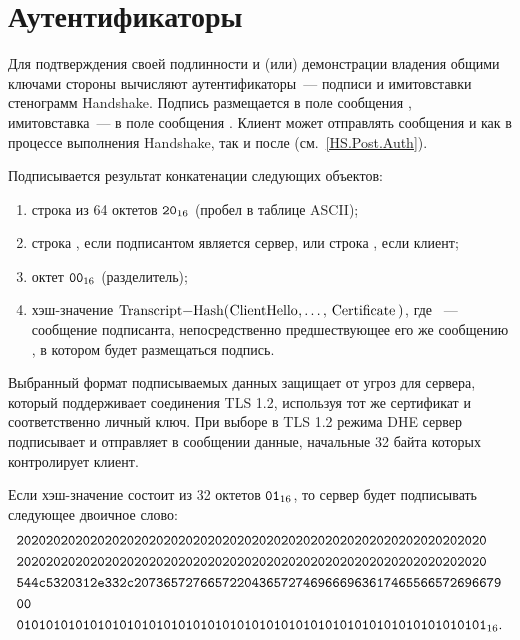 \section{Аутентификаторы}\label{CRYPTO.Auth} 

Для подтверждения своей подлинности и (или) демонстрации владения общими ключами 
стороны вычисляют аутентификаторы~--- подписи и имитовставки стенограмм Handshake. 
%
Подпись размещается в поле  сообщения 
, имитовставка~--- в поле  
сообщения .
%
Клиент может отправлять сообщения  и 
 как в процессе выполнения Handshake, так и после 
(см.~\ref{HS.Post.Auth}).

Подписывается результат конкатенации следующих объектов: 
\begin{enumerate}[label=\arabic*)]
\item
строка из 64 октетов $\texttt{20}_{16}$ (пробел в таблице ASCII);
\item
строка , если подписантом 
является сервер, или строка , если 
клиент; 
%
%
\item
октет $\texttt{00}_{16}$ (разделитель);
\item
хэш-значение 
$\code{Transcript-Hash}(\code{ClientHello},\ldots,\code{Certificate})$, 
где ~--- сообщение подписанта, непосредственно 
предшествующее его же сообщению , в котором 
будет размещаться подпись.
\end{enumerate}

\begin{note*}
Выбранный формат подписываемых данных защищает от угроз для сервера, который
поддерживает соединения TLS 1.2, используя тот же сертификат и соответственно
личный ключ. При выборе в TLS 1.2 режима DHE сервер подписывает и отправляет в
сообщении  данные, начальные 32 байта которых 
контролирует клиент.
\end{note*}


\begin{example*}
Если хэш-значение состоит из 32 октетов $\texttt{01}_{16}$, то сервер будет подписывать 
следующее двоичное слово:
\begin{align*}
&\texttt{2020202020202020202020202020202020202020202020202020202020202020}\\
&\texttt{2020202020202020202020202020202020202020202020202020202020202020}\\
&\texttt{544c5320312e332c20736572766572204365727469666963617465566572696679}\\
&\texttt{00}\\
&\texttt{0101010101010101010101010101010101010101010101010101010101010101}_{16}.
\end{align*}
\end{example*}

